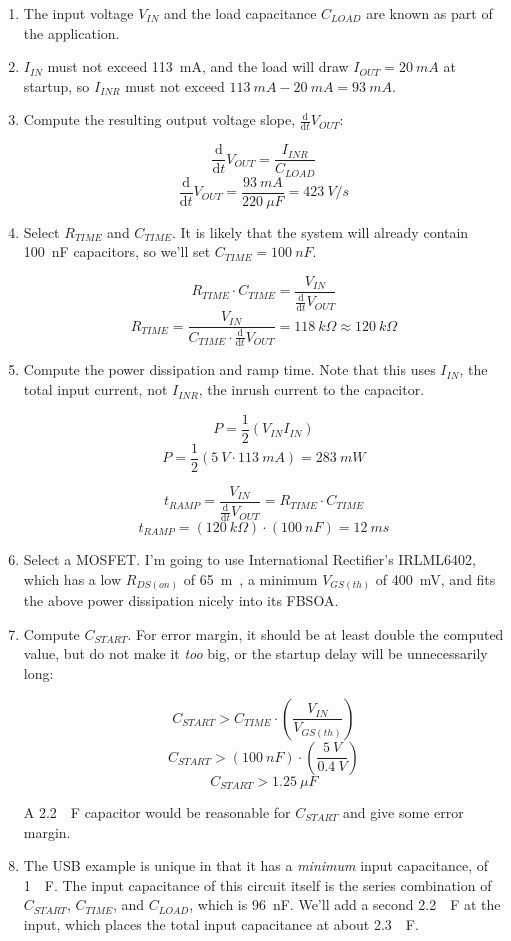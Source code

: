 \documentclass[letterpaper,12pt]{article}
\newcommand{\ddt}{\ensuremath{\frac{\mathrm{d}}{\mathrm{d}t}}}
\begin{document}
\begin{enumerate}
\item{The input voltage $V_{IN}$ and the load capacitance $C_{LOAD}$ are known as part
    of the application.}
\item{$I_{IN}$ must not exceed \SI{113}{mA}, and the load will draw $I_{OUT} = \SI{20}{mA}$
    at startup, so $I_{INR}$ must not exceed $\SI{113}{mA} - \SI{20}{mA} = \boxed{\SI{93}{mA}}$.}
\item{Compute the resulting output voltage slope, $\ddt V_{OUT}$:

    $$ \ddt V_{OUT} = \frac{I_{INR}}{C_{LOAD}} $$
    $$ \ddt V_{OUT} = \frac{\SI{93}{mA}}{\SI{220}{\mu F}} = \boxed{\SI{423}{V/s}} $$ }
\item{Select $R_{TIME}$ and $C_{TIME}$. It is likely that the system will already contain
    \SI{100}{nF} capacitors, so we'll set $C_{TIME} = \boxed{\SI{100}{nF}}$.

    $$ R_{TIME} \cdot C_{TIME} = \frac{V_{IN}}{\ddt V_{OUT}} $$
    $$ R_{TIME} = \frac{V_{IN}}{C_{TIME} \cdot \ddt V_{OUT}} = \SI{118}{k\Omega} \approx \boxed{\SI{120}{k\Omega}} $$ }
\item{Compute the power dissipation and ramp time. Note that this uses $I_{IN}$, the total input
    current, not $I_{INR}$, the inrush current to the capacitor.

    $$ P = \frac{1}{2}\left( V_{IN} I_{IN} \right) $$
    $$ P = \frac{1}{2}\left( \SI{5}{V} \cdot \SI{113}{mA} \right) = \boxed{\SI{283}{mW}} $$

    $$ t_{RAMP} = \frac{V_{IN}}{\ddt V_{OUT}} = R_{TIME} \cdot C_{TIME} $$
    $$ t_{RAMP} = (\SI{120}{k\Omega})\cdot(\SI{100}{nF}) = \boxed{\SI{12}{ms}} $$ }
\item{Select a MOSFET. I'm going to use International Rectifier's IRLML6402, which has
    a low $R_{DS(on)}$ of \SI{65}{m\Omega}, a minimum $V_{GS(th)}$ of \SI{400}{mV},
    and fits the above power dissipation nicely into its FBSOA\cite{irlml6402}.}
\item{Compute $C_{START}$. For error margin, it should be at least double the computed
value, but do not make it \emph{too} big, or the startup delay will be unnecessarily long:

    $$ C_{START} > C_{TIME} \cdot \left( \frac{V_{IN}}{V_{GS(th)}} \right) $$
    $$ C_{START} > (\SI{100}{nF}) \cdot \left( \frac{\SI{5}{V}}{\SI{0.4}{V}} \right) $$
    $$ C_{START} > \boxed{\SI{1.25}{\mu F}} $$

A \SI{2.2}{\mu F} capacitor would be reasonable for $C_{START}$ and give some error margin.}

\item{The USB example is unique in that it has a \emph{minimum} input capacitance, of \SI{1}{\mu F}.
    The input capacitance of this circuit itself is the series combination of $C_{START}$, $C_{TIME}$,
    and $C_{LOAD}$, which is \SI{96}{nF}. We'll add a second \SI{2.2}{\mu F} at the input, which places
    the total input capacitance at about \SI{2.3}{\mu F}.}

\end{enumerate}
\end{document}
